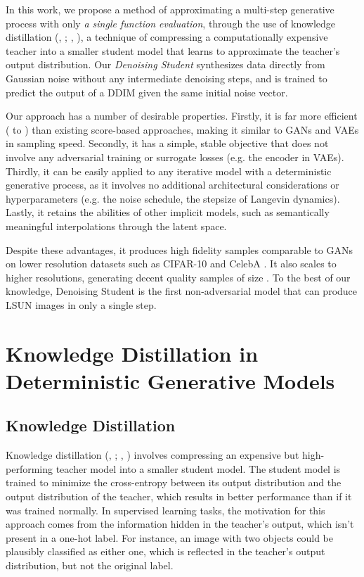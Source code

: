 \documentclass[12pt,a4paper]{article}
\newcommand{\citep}[1]{\citeauthor{#1}, \citeyear{#1}}
\begin{document}
In this work, we propose a method of approximating a multi-step generative process with only \textit{a single function evaluation}, through the use of knowledge distillation (\citep{bucilua2006model}; \citep{hinton2015distilling}), a technique of compressing a computationally expensive teacher into a smaller student model that learns to approximate the teacher's output distribution. Our \textit{Denoising Student} synthesizes data directly from Gaussian noise without any intermediate denoising steps, and is trained to predict the output of a DDIM given the same initial noise vector. 

Our approach has a number of desirable properties. Firstly, it is far more efficient ( to ) than existing score-based approaches, making it similar to GANs and VAEs in sampling speed. Secondly, it has a simple, stable objective that does not involve any adversarial training or surrogate losses (e.g. the encoder in VAEs). Thirdly, it can be easily applied to any iterative model with a deterministic generative process, as it involves no additional architectural considerations or hyperparameters (e.g. the noise schedule, the stepsize of Langevin dynamics). Lastly, it retains the abilities of other implicit models, such as semantically meaningful interpolations through the latent space.

Despite these advantages, it produces high fidelity samples comparable to GANs on lower resolution datasets such as CIFAR-10 and CelebA . It also scales to higher resolutions, generating decent quality samples of size . To the best of our knowledge, Denoising Student is the first non-adversarial model that can produce  LSUN images in only a single step.


\section{Knowledge Distillation in Deterministic Generative Models}

\subsection{Knowledge Distillation}
Knowledge distillation (\citep{bucilua2006model}; \citep{hinton2015distilling}) involves compressing an expensive but high-performing teacher model into a smaller student model. The student model is trained to minimize the cross-entropy between its output distribution and the output distribution of the teacher, which results in better performance than if it was trained normally. In supervised learning tasks, the motivation for this approach comes from the information hidden in the teacher's output, which isn't present in a one-hot label. For instance, an image with two objects could be plausibly classified as either one, which is reflected in the teacher's output distribution, but not the original label. 
\end{document}
